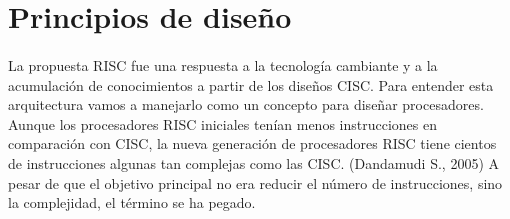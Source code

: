 \documentclass[10pt,a4paper]{article}
\begin{document}
\section*{Principios de diseño}
\paragraph{}
La propuesta RISC fue una respuesta a la tecnología cambiante y a la acumulación de conocimientos a partir de los diseños CISC. Para entender esta arquitectura vamos a manejarlo como un concepto para diseñar procesadores. Aunque los procesadores RISC iniciales tenían menos instrucciones en comparación con CISC, la nueva generación de procesadores RISC tiene cientos de instrucciones algunas tan complejas como las CISC. (Dandamudi S., 2005) A pesar de que el objetivo principal no era reducir el número de instrucciones, sino la complejidad, el término se ha pegado. 
\end{document}
